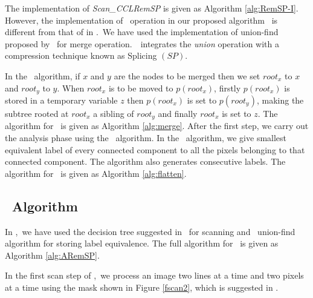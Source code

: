 
% 
The implementation of {\em Scan\_CCLRemSP} is given as Algorithm
\ref{alg:RemSP-I}. However, the implementation of \merge\ operation in our
proposed algorithm \remsp\ is different from that of in \lrpc.\
We have used the implementation of union-find proposed by \rems\ 
for merge operation\cite{Patwary2010_RemSP, Dijkstra1976_RemSP}.\ \rems\ integrates the {\em union}
operation with a compression technique known as Splicing $(SP)$. 

In the \merge\ algorithm, if $x$ and $y$ are the nodes to be merged then we set $root_x$ to $x$ and $root_y$ to $y$. 
When $root_x$ is to be moved to $p(root_x)$, firstly $p(root_x)$ is
stored in a temporary variable $z$ then $p(root_x)$ is set to $p(root_y)$,
making the subtree rooted at $root_x$ a sibling of $root_y$ and finally
$root_x$ is set to $z$. The algorithm for \merge\ is given as Algorithm
\ref{alg:merge}. After the first step, we carry out the analysis phase using the \flatten\ algorithm. In the \flatten\ algorithm, we give smallest equivalent label of every connected component to all the pixels belonging to that connected component. The algorithm also
generates consecutive labels. The algorithm for \flatten\ is given as Algorithm
\ref{alg:flatten}. 



%
\subsection{\aremsp\ Algorithm}

In \aremsp,\ we have used the decision tree suggested in \arun\ 
for scanning and \rems\ union-find algorithm for storing label equivalence. The
full algorithm for \aremsp\ is given as Algorithm \ref{alg:ARemSP}.

In the first scan step of \aremsp,\ we process an image two lines at a time and
two pixels at a time using the mask shown in Figure \ref{fscan2}, which is
suggested in \cite{He2012_ARun}.


% 




